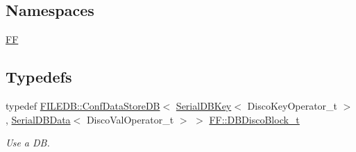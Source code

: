\subsection*{Namespaces}
\begin{DoxyCompactItemize}
\item 
 \mbox{\hyperlink{namespaceFF}{FF}}
\end{DoxyCompactItemize}
\subsection*{Typedefs}
\begin{DoxyCompactItemize}
\item 
typedef \mbox{\hyperlink{classFILEDB_1_1ConfDataStoreDB}{F\+I\+L\+E\+D\+B\+::\+Conf\+Data\+Store\+DB}}$<$ \mbox{\hyperlink{classADATIO_1_1SerialDBKey}{Serial\+D\+B\+Key}}$<$ Disco\+Key\+Operator\+\_\+t $>$, \mbox{\hyperlink{classADATIO_1_1SerialDBData}{Serial\+D\+B\+Data}}$<$ Disco\+Val\+Operator\+\_\+t $>$ $>$ \mbox{\hyperlink{namespaceFF_afff37fccef0384964e1f8a8d20451ede}{F\+F\+::\+D\+B\+Disco\+Block\+\_\+t}}
\begin{DoxyCompactList}\small\item\em Use a DB. \end{DoxyCompactList}\end{DoxyCompactItemize}
